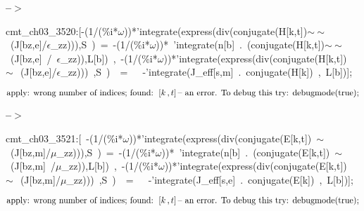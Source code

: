 \documentclass[fleqn]{article}
\begin{document}
\noindent
\begin{minipage}[t]{4.000000em}\color{red}\bfseries
 --\ensuremath{\ensuremath{>}}	
\end{minipage}
\begin{minipage}[t]{\textwidth}\color{blue}
cmt\_ch03\_3520:[-(1/(\%i*\ensuremath{\omega}))*'integrate(express(div(conjugate(H[k,t])\ensuremath{\sim\ }\ensuremath{\sim\ }\ (J[bz,e]/\ensuremath{\epsilon}\_zz))),S\ )\ =\ -(1/(\%i*\ensuremath{\omega}))*\ 'integrate(n[b]\ .\ (conjugate(H[k,t])\ensuremath{\sim\ }\ensuremath{\sim\ }\ (J[bz,e]\ /\ \ensuremath{\epsilon}\_zz)),L[b])\ ,\ -(1/(\%i*\ensuremath{\omega}))*'integrate(express(div(conjugate(H[k,t])\ \ensuremath{\sim\ }\ (J[bz,e]/\ensuremath{\epsilon}\_zz)))\ ,S\ )\ \ =\ \ \ -'integrate(J\_eff[s,m]\ .\ conjugate(H[k])\ ,\ L[b])];
\end{minipage}
\[\displaystyle \mbox{}\\\mbox{%
apply: wrong number of indices; found: }\left[ k\operatorname{,}t\right] \mbox{%
 -- an error. To debug this try: debugmode(true);}\mbox{}
\]


\noindent
\begin{minipage}[t]{4.000000em}\color{red}\bfseries
 --\ensuremath{\ensuremath{>}}	
\end{minipage}
\begin{minipage}[t]{\textwidth}\color{blue}
cmt\_ch03\_3521:[\ -(1/(\%i*\ensuremath{\omega}))*'integrate(express(div(conjugate(E[k,t])\ \ensuremath{\sim\ }\ (J[bz,m]/\ensuremath{\mu}\_zz))),S\ )\ =\ -(1/(\%i*\ensuremath{\omega}))*\ 'integrate(n[b]\ .\ (conjugate(E[k,t])\ \ensuremath{\sim\ }\ (J[bz,m]\ /\ensuremath{\mu}\_zz)),L[b])\ ,\ -(1/(\%i*\ensuremath{\omega}))*'integrate(express(div(conjugate(E[k,t])\ \ensuremath{\sim\ }\ (J[bz,m]/\ensuremath{\mu}\_zz)))\ ,S\ )\ \ =\ \ \ -'integrate(J\_eff[s,e]\ .\ conjugate(E[k])\ ,\ L[b])];
\end{minipage}
\[\displaystyle \mbox{}\\\mbox{%
apply: wrong number of indices; found: }\left[ k\operatorname{,}t\right] \mbox{%
 -- an error. To debug this try: debugmode(true);}\mbox{}
\]
\end{document}
